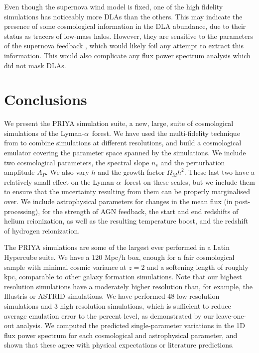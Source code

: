 \documentclass[a4paper,11pt]{article}
\newcommand{\Lya}{Lyman-$\alpha$}
\begin{document}
Even though the supernova wind model is fixed, one of the high fidelity simulations has noticeably more DLAs than the others. This may indicate the presence of some cosmological information in the DLA abundance, due to their status as tracers of low-mass halos. However, they are sensitive to the parameters of the supernova feedback \cite{Bird:2014}, which would likely foil any attempt to extract this information. This would also complicate any flux power spectrum analysis which did not mask DLAs.

\section{Conclusions}
\label{sec:conclusions}

We present the PRIYA simulation suite, a new, large, suite of cosmological simulations of the \Lya~forest. We have used the multi-fidelity technique from \cite{Ho:2022, Fernandez:2022} to combine simulations at different resolutions, and build a cosmological emulator covering the parameter space spanned by the simulations. We include two cosmological parameters, the spectral slope $n_s$ and the perturbation amplitude $A_P$. We also vary $h$ and the growth factor $\Omega_M h^2$. These last two have a relatively small effect on the \Lya~forest on these scales, but we include them to ensure that the uncertainty resulting from them can be properly marginalised over. We include astrophysical parameters for changes in the mean flux (in post-processing), for the strength of AGN feedback, the start and end redshifts of helium reionization, as well as the resulting temperature boost, and the redshift of hydrogen reionization.

The PRIYA simulations are some of the largest ever performed in a Latin Hypercube suite. We have a $120$ Mpc/h box, enough for a fair cosmological sample with minimal cosmic variance at $z=2$ and a softening length of roughly kpc, comparable to other galaxy formation simulations. Note that our highest resolution simulations have a moderately higher resolution than, for example, the Illustris \cite{Vogelsberger:2014} or ASTRID \cite{Bird:2022, Ni:2021} simulations. We have performed $48$ low resolution simulations and $3$ high resolution simulations, which is sufficient to reduce average emulation error to the percent level, as demonstrated by our leave-one-out analysis. We computed the predicted single-parameter variations in the 1D flux power spectrum for each cosmological and astrophysical parameter, and shown that these agree with physical expectations or literature predictions.
\end{document}
